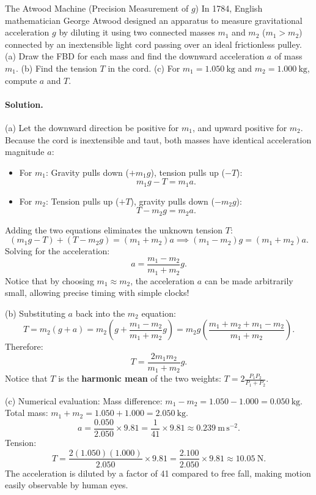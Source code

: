 \begin{workedexample}{The Atwood Machine (Precision Measurement of $g$)}
In 1784, English mathematician George Atwood designed an apparatus to measure gravitational acceleration $g$ by diluting it using two connected masses $m_1$ and $m_2$ ($m_1 > m_2$) connected by an inextensible light cord passing over an ideal frictionless pulley.
(a) Draw the FBD for each mass and find the downward acceleration $a$ of mass $m_1$.
(b) Find the tension $T$ in the cord.
(c) For $m_1 = 1.050\ \mathrm{kg}$ and $m_2 = 1.000\ \mathrm{kg}$, compute $a$ and $T$.

\paragraph{Solution.}

(a) Let the downward direction be positive for $m_1$, and upward positive for $m_2$.
Because the cord is inextensible and taut, both masses have identical acceleration magnitude $a$:
\begin{itemize}[leftmargin=1.4em,itemsep=2pt]
  \item For $m_1$: Gravity pulls down ($+m_1 g$), tension pulls up ($-T$):
        \[
        m_1 g - T = m_1 a.
        \]
  \item For $m_2$: Tension pulls up ($+T$), gravity pulls down ($-m_2 g$):
        \[
        T - m_2 g = m_2 a.
        \]
\end{itemize}
Adding the two equations eliminates the unknown tension $T$:
\[
(m_1 g - T) + (T - m_2 g) = (m_1 + m_2)a \implies (m_1 - m_2)g = (m_1 + m_2)a.
\]
Solving for the acceleration:
\[
\boxed{a = \frac{m_1 - m_2}{m_1 + m_2}g.}
\]
Notice that by choosing $m_1 \approx m_2$, the acceleration $a$ can be made arbitrarily small, allowing precise timing with simple clocks!

(b) Substituting $a$ back into the $m_2$ equation:
\[
T = m_2(g + a) = m_2\left( g + \frac{m_1 - m_2}{m_1 + m_2}g \right) = m_2 g\left( \frac{m_1 + m_2 + m_1 - m_2}{m_1 + m_2} \right).
\]
Therefore:
\[
\boxed{T = \frac{2 m_1 m_2}{m_1 + m_2}g.}
\]
Notice that $T$ is the \textbf{harmonic mean} of the two weights: $T = 2\frac{P_1 P_2}{P_1 + P_2}$.

(c) Numerical evaluation:
Mass difference: $m_1 - m_2 = 1.050 - 1.000 = 0.050\ \mathrm{kg}$.
Total mass: $m_1 + m_2 = 1.050 + 1.000 = 2.050\ \mathrm{kg}$.
\[
a = \frac{0.050}{2.050}\times 9.81 = \frac{1}{41}\times 9.81 \approx \mathbf{0.239\ \mathrm{m\,s^{-2}}.}
\]
Tension:
\[
T = \frac{2(1.050)(1.000)}{2.050}\times 9.81 = \frac{2.100}{2.050}\times 9.81 \approx \mathbf{10.05\ \mathrm{N}.}
\]
The acceleration is diluted by a factor of 41 compared to free fall, making motion easily observable by human eyes.
\end{workedexample}

